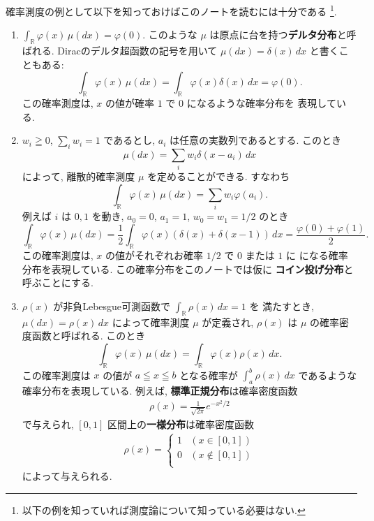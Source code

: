\documentclass[12pt,twoside]{jarticle}
\newcommand\BF{\bfseries}
\newcommand\R{{\mathbb R}} %
\theoremstyle{jplain}
\theoremstyle{jplain}
\theoremstyle{jplain}
\numberwithin{theorem}{section}
\numberwithin{equation}{section}
\numberwithin{figure}{section}
\numberwithin{table}{section}
\begin{document}
確率測度の例として以下を知っておけばこのノートを読むには十分である%
\footnote{以下の例を知っていれば測度論について知っている必要はない.}.
\begin{enumerate}
  \item $\int_\R \varphi(x)\,\mu(dx) = \varphi(0)$.
  このような $\mu$ は原点に台を持つ{\BF デルタ分布}と呼ばれる.
  Diracのデルタ超函数の記号を用いて $\mu(dx)=\delta(x)\,dx$ と書くこともある:
  \begin{equation*}
    \int_\R \varphi(x)\,\mu(dx)
    = \int_\R \varphi(x)\delta(x)\,dx
    = \varphi(0).
  \end{equation*}
  この確率測度は, $x$ の値が確率 $1$ で $0$ になるような確率分布を
  表現している.

  \item $w_i\geqq 0$, $\sum_i w_i=1$ であるとし,
  $a_i$ は任意の実数列であるとする. このとき
  \begin{equation*}
    \mu(dx)=\sum_i w_i\delta(x-a_i)\,dx
  \end{equation*}
  によって, 離散的確率測度 $\mu$ を定めることができる. すなわち
  \begin{equation*}
    \int_\R \varphi(x)\,\mu(dx)=\sum_i w_i\varphi(a_i).
  \end{equation*}
  例えば $i$ は $0,1$ を動き, $a_0=0$, $a_1=1$, $w_0=w_1=1/2$ のとき
  \begin{equation*}
    \int_\R \varphi(x)\,\mu(dx)
    =\frac12\int_\R \varphi(x)(\delta(x)+\delta(x-1))\,dx
    = \frac{\varphi(0)+\varphi(1)}2.
  \end{equation*}
  この確率測度は, $x$ の値がそれぞれお確率 $1/2$ で $0$ または $1$ に
  になる確率分布を表現している. この確率分布をこのノートでは仮に
  {\BF コイン投げ分布}と呼ぶことにする.

  \item $\rho(x)$ が非負Lebesgue可測函数で $\int_\R \rho(x)\,dx=1$ を
  満たすとき, $\mu(dx) = \rho(x)\,dx$ によって確率測度 $\mu$ が定義され,
  $\rho(x)$ は $\mu$ の確率密度函数と呼ばれる. このとき
  \begin{equation*}
    \int_\R \varphi(x)\,\mu(dx)=\int_\R\varphi(x)\rho(x)\,dx.
  \end{equation*}
  この確率測度は $x$ の値が $a\leqq x\leqq b$ となる確率が
  $\int_a^b\rho(x)\,dx$ であるような確率分布を表現している.
  例えば, {\BF 標準正規分布}は確率密度函数
  \begin{align*}
    \rho(x) = \frac1{\sqrt{2\pi}}e^{-x^2/2}
  \end{align*}
  で与えられ, $[0,1]$ 区間上の{\BF 一様分布}は確率密度函数
  \begin{align*}
    \rho(x) = \begin{cases}
      1 & (x\in[0,1]) \\
      0 & (x\not\in[0,1])\\
    \end{cases}
  \end{align*}
  によって与えられる.
\end{enumerate}
\end{document}
